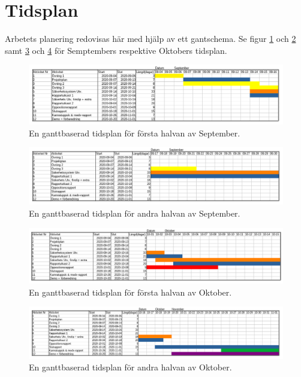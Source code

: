 \documentclass[a4paper]{article}
\begin{document}
\section{Tidsplan}
\label{sec:tidsplan}
Arbetets planering redovisas här med hjälp av ett gantschema. Se figur \ref{fig:sept1} och \ref{fig:sept2} samt \ref{fig:oct1} och \ref{fig:oct2} för Semptembers respektive Oktobers tidsplan. 

\begin{figure}[h]
    \centering
    \includegraphics[scale=0.44, angle=0]{dokumentation/projektplan/september1.png}
    \caption{En ganttbaserad tidsplan för första halvan av September.}
    \label{fig:sept1}
\end{figure}

\begin{figure}[h]
    \centering
    \includegraphics[scale=0.44, angle=0]{dokumentation/projektplan/september2.png}
    \caption{En ganttbaserad tidsplan för andra halvan av September.}
    \label{fig:sept2}
\end{figure}
\newpage
\begin{figure}[h]
    \centering
    \includegraphics[scale=0.43, angle=0]{dokumentation/projektplan/oktober1.png}
    \caption{En ganttbaserad tidsplan för första halvan av Oktober.}
    \label{fig:oct1}
\end{figure}

\begin{figure}[h]
    \centering
    \includegraphics[scale=0.36, angle=0]{dokumentation/projektplan/oktober2.png}
    \caption{En ganttbaserad tidsplan för andra halvan av Oktober.}
    \label{fig:oct2}
\end{figure}
\end{document}
